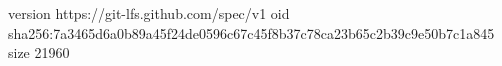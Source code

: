 version https://git-lfs.github.com/spec/v1
oid sha256:7a3465d6a0b89a45f24de0596c67c45f8b37c78ca23b65c2b39c9e50b7c1a845
size 21960
